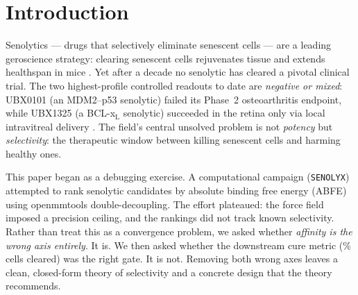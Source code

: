 \documentclass[11pt,a4paper]{article}
\newcommand{\fs}{f_{\mathrm{s}}}
\newcommand{\fq}{f_{\mathrm{q}}}
\begin{document}
\begin{abstract}
anti-selective ($0.92\times$), a two-axis gate collapses below $2\times$ under
modest axis correlation, and only a \emph{three-axis} AND-gate
(uPAR\,$\times$\,DPP4\,$\times$\,SA-$\beta$-gal) is robust ($23\times$ median,
adverse-box minimum $4.34\times$). Combined with a kill-axis term
$\fs/\fq\approx1.6\times$, the realistic total selectivity is
$\sim$\,$13.5$--$26\times$. The resulting design, \textbf{SENOLYX-AG}, is a
galacto-caged BCL-x$_{\mathrm L}$/MCL-1 PROTAC inside a surface-marker-gated
local-delivery particle, first-targeted to the periodontal niche. Every
molecular component is published chemistry; the novelty is the composition.
The single remaining make-or-break unknown is the cross-axis correlation
$\rho$, which we bound by regulatory-hub independence and which a single
three-color flow-cytometry experiment would close. All claims are in-silico /
literature-grounded; wet-lab confirmation is explicitly downstream.
\end{abstract}

\tableofcontents
\bigskip

\section{Introduction}
\label{sec:intro}

Senolytics --- drugs that selectively eliminate senescent cells --- are a
leading geroscience strategy: clearing senescent cells rejuvenates tissue and
extends healthspan in mice \citep{baker2011,baker2016}. Yet after a decade no
senolytic has cleared a pivotal clinical trial. The two highest-profile
controlled readouts to date are \emph{negative or mixed}: UBX0101 (an
MDM2--p53 senolytic) failed its Phase~2 osteoarthritis endpoint, while UBX1325
(a BCL-x$_{\mathrm L}$ senolytic) succeeded in the retina only via local
intravitreal delivery \citep{ubx1325}. The field's central unsolved problem is
not \emph{potency} but \emph{selectivity}: the therapeutic window between
killing senescent cells and harming healthy ones.

This paper began as a debugging exercise. A computational campaign
(\texttt{SENOLYX}) attempted to rank senolytic candidates by absolute binding
free energy (ABFE) using openmmtools double-decoupling. The effort plateaued:
the force field imposed a precision ceiling, and the rankings did not track
known selectivity. Rather than treat this as a convergence problem, we asked
whether \emph{affinity is the wrong axis entirely}. It is. We then asked
whether the downstream cure metric (\% cells cleared) was the right gate. It is
not. Removing both wrong axes leaves a clean, closed-form theory of selectivity
and a concrete design that the theory recommends.
\end{document}
